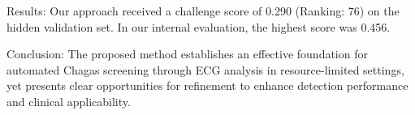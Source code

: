 \documentclass{cinc-abstract}
\newcommand\wordcount{ \currfilepath"}}
\begin{document}
Results: Our approach received a challenge score of 0.290 (Ranking: 76) on the hidden validation set. In our internal evaluation, the highest score was 0.456.

Conclusion: The proposed method establishes an effective foundation for automated Chagas screening through ECG analysis in resource-limited settings, yet presents clear opportunities for refinement to enhance detection performance and clinical applicability.


\end{document}
